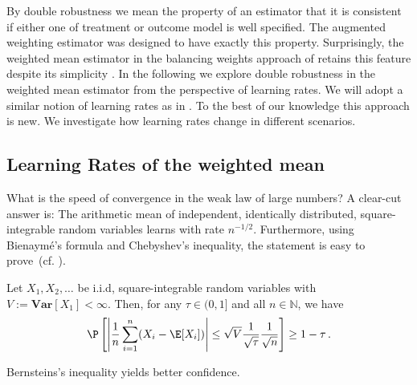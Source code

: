 
By double robustness we mean the property of an estimator that it is consistent if either one of treatment or outcome model is well specified.
The augmented weighting estimator was designed to have exactly this property.
Surprisingly, the weighted mean estimator in the balancing weights approach of \cite{Wang2019} retains this feature despite its simplicity \cite{Zhao2017a}. 
In the following we explore double robustness in the weighted mean estimator from the perspective of learning rates.
We will adopt a similar notion of learning rates as in \cite{Steinwart2008}.
To the best of our knowledge this approach is new.
We investigate how learning rates change in different scenarios. 
\subsection{Learning Rates of the weighted mean}

What is the speed of convergence in the weak law of large numbers?
A clear-cut answer is:
The arithmetic mean of independent, identically distributed, square-integrable random variables 
learns with rate $n^{-1/2}$.
Furthermore, using
Bienaymé's formula and Chebyshev's inequality, the statement is easy to prove~(cf. \cite[Theorem~5.14]{Klenke2020}).


\begin{theorem*}
  Let 
  $
    X_1,X_2,\ldots
  $
  be i.i.d, square-integrable random variables with 
  $
    V:=
    \mathbf{Var}[X_1]
    <\infty
  $.
  Then, for any $\tau \in (0,1]$ and all $n\in\mathbb{N}$, we have
  \begin{gather}
   \P
   \left[
     \left| 
   \frac{1}{n}
   \sum_{i=1}^{n}
   (X_i - \E[X_i])
     \right|
     \le
     \sqrt{V}
     \frac{1}{\sqrt{\tau}}
     \frac{1}{\sqrt{n}}
   \right]
   \ge
   1-\tau\,.
  \end{gather}
\end{theorem*}
\begin{reflection*}
  Bernsteins's inequality yields better confidence.
\end{reflection*}

